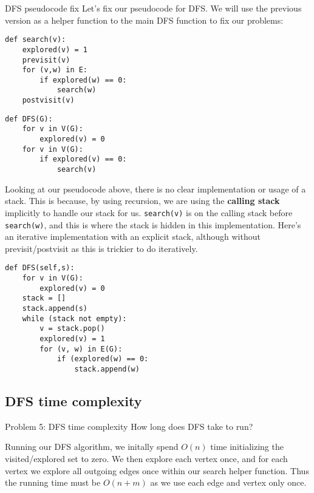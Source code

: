 \documentclass{article}
\begin{document}
\begin{strategy}{DFS pseudocode fix}
    Let's fix our pseudocode for DFS. We will use the previous version as a helper function to the main DFS function to fix our problems:
    \begin{lstlisting}[mathescape=true]
def search(v):
    explored(v) = 1
    previsit(v)
    for (v,w) in E:
        if explored(w) == 0:
            search(w)
    postvisit(v)
    \end{lstlisting}  


    \begin{lstlisting}
def DFS(G):
    for v in V(G):
        explored(v) = 0
    for v in V(G):
        if explored(v) == 0:
            search(v)
    \end{lstlisting}
\end{strategy}

\begin{note}
    Looking at our pseudocode above, there is no clear implementation or usage of a stack. This is because, by using recursion, we are using the \textbf{calling stack} implicitly to handle our stack for us. \lstinline{search(v)} is on the calling stack before \lstinline{search(w)}, and this is where the stack is hidden in this implementation. Here's an iterative implementation with an explicit stack, although without previsit/postvisit as this is trickier to do iteratively.

    \begin{lstlisting}
def DFS(self,s):
    for v in V(G):
        explored(v) = 0
    stack = []
    stack.append(s)
    while (stack not empty):
        v = stack.pop()
        explored(v) = 1
        for (v, w) in E(G):
            if (explored(w) == 0:
                stack.append(w)
    \end{lstlisting}
    
\end{note}

\subsection{DFS time complexity}

\begin{problem}{Problem 5: DFS time complexity}
    How long does DFS take to run?
\end{problem}
Running our DFS algorithm, we initally spend $O(n)$ time initializing the visited/explored set to zero. We then explore each vertex once, and for each vertex we explore all outgoing edges once within our search helper function. Thus the running time must be $O(n + m)$ as we use each edge and vertex only once.
\end{document}
